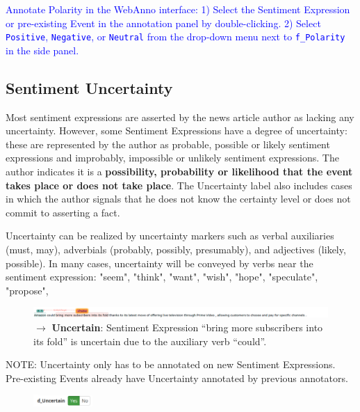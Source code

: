\noindent
\textcolor{Blue}{Annotate Polarity in the WebAnno interface:
1) Select the Sentiment Expression or pre-existing Event in the annotation panel by double-clicking.
2) Select \texttt{Positive}, \texttt{Negative}, or \texttt{Neutral} from the drop-down menu next to \texttt{f\_Polarity} in the side panel.}

\subsection{Sentiment Uncertainty}
\label{sec:uncertaintydefinition}
Most sentiment expressions are asserted by the news article author as lacking any uncertainty.
However, some Sentiment Expressions have a degree of uncertainty: these are represented by the author as probable, possible or likely sentiment expressions and improbably, impossible or unlikely sentiment expressions.
The author indicates it is a \textbf{possibility, probability or likelihood that the event takes place or does not take place}.
The Uncertainty label also includes cases in which the author signals that he does not know the certainty level or does not commit to asserting a fact.

Uncertainty can be realized by uncertainty markers such as verbal auxiliaries (must, may), adverbials (probably, possibly, presumably), and adjectives (likely, possible).
In many cases, uncertainty will be conveyed by verbs near the sentiment expression: "seem", "think", "want", "wish", "hope", "speculate", "propose", 

\begin{figure}[h]
    \centering
    \includegraphics[width=\textwidth]{img/amzn04s31 uncertain example.png}
    \caption*{$\rightarrow$ \textbf{Uncertain}: Sentiment Expression ``bring more subscribers into its fold'' is uncertain due to the auxiliary verb ``could''.}
    \label{fig:unc_ex1}
\end{figure}

\noindent
\textcolor{BrickRed}{NOTE: Uncertainty only has to be annotated on new Sentiment Expressions. Pre-existing Events already have Uncertainty annotated by previous annotators.}\\

\begin{figure}
    \centering
    \includegraphics[width=0.2\textwidth]{img/uncertainui.png}
    \label{fig:uncertainui}
\end{figure}


